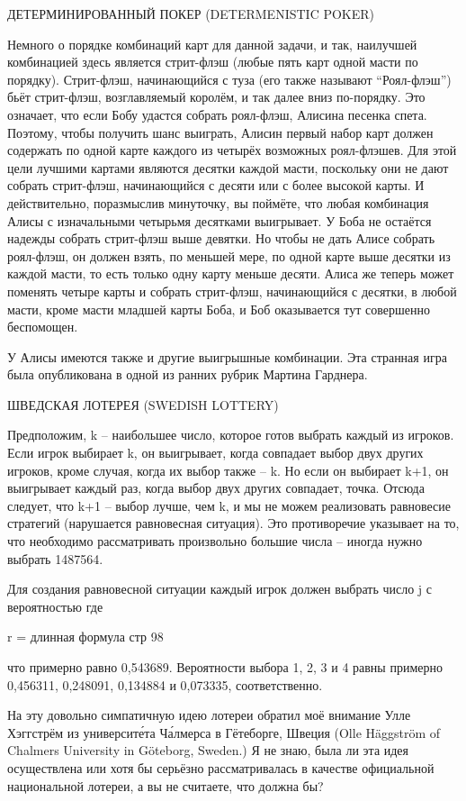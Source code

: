 ДЕТЕРМИНИРОВАННЫЙ ПОКЕР (DETERMENISTIC POKER)


   Немного о порядке комбинаций карт для данной задачи, и так, наилучшей комбинацией здесь является стрит-флэш (любые пять карт одной масти по порядку).
Стрит-флэш, начинающийся с туза (его также называют “Роял-флэш”) бьёт стрит-флэш, возглавляемый королём, и так далее вниз по-порядку.
   Это означает, что если Бобу удастся собрать роял-флэш, Алисина песенка спета. Поэтому, чтобы получить шанс выиграть, Алисин первый набор карт должен содержать по одной карте каждого из четырёх возможных роял-флэшев.
   Для этой цели лучшими картами являются десятки каждой масти, поскольку они не дают собрать стрит-флэш, начинающийся с десяти или с более высокой карты. И действительно,  поразмыслив минуточку, вы поймёте, что любая комбинация Алисы с изначальными четырьмя десятками выигрывает. У Боба не остаётся надежды собрать стрит-флэш выше девятки. Но чтобы не дать Алисе собрать роял-флэш, он должен взять, по меньшей мере, по одной карте выше десятки из каждой масти, то есть только одну карту меньше десяти. Алиса же теперь может поменять четыре карты и собрать стрит-флэш, начинающийся с десятки, в любой масти, кроме масти младшей карты Боба,
и Боб оказывается тут совершенно беспомощен.


   У Алисы имеются также и другие выигрышные комбинации. Эта странная игра была опубликована в одной из ранних рубрик  Мартина Гарднера.




 ШВЕДСКАЯ ЛОТЕРЕЯ (SWEDISH LOTTERY)


  Предположим, k -- наибольшее число, которое готов выбрать каждый из игроков. Если игрок выбирает k, он выигрывает, когда совпадает выбор двух других игроков, кроме случая, когда их выбор также -- k. Но если он выбирает k+1, он выигрывает каждый раз, когда выбор двух других совпадает, точка. Отсюда следует, что k+1 -- выбор лучше, чем k, и мы не можем реализовать равновесие стратегий (нарушается равновесная ситуация). 
Это противоречие указывает на то, что необходимо рассматривать произвольно большие числа -- иногда нужно выбрать 1487564.


 Для создания равновесной ситуации каждый игрок должен выбрать число j с вероятностью где 


        r = длинная формула стр 98


что примерно равно 0,543689. Вероятности выбора 1, 2, 3 и 4  равны примерно 0,456311, 0,248091, 0,134884 и 0,073335, соответственно.


  На эту довольно симпатичную идею лотереи обратил  моё внимание Улле Хэггстрём из университе́та Ча́лмерса в Гётеборге, Швеция (Olle Häggström of Chalmers University in Göteborg, Sweden.) Я не знаю, была ли эта идея осуществлена или хотя бы серьёзно рассматривалась в качестве  официальной национальной лотереи,  а вы не считаете, что должна бы?




